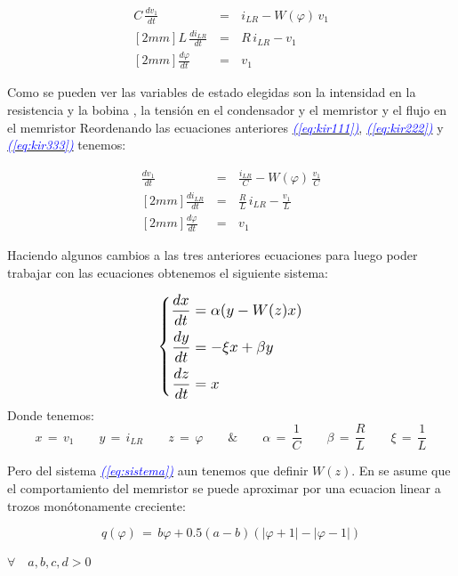 \documentclass[12pt,a4paper]{report} %
\newcommand{\eref}[1]{\hyperref[#1]{\textcolor{blue}{\textit{(\ref*{#1})}}}}
\begin{document}
	
	\begin{eqnarray}
		C\,\frac{dv_1}{dt}\,&=&\,i_{LR}-W(\varphi)\,v_1 \label{eq:kir111} \\ [2mm]
		L\,\frac{di_{LR}}{dt}\,&=&\,R\,i_{LR}-v_1 \label{eq:kir222} \\ [2mm]
		\frac{d\varphi}{dt}\,&=&\,v_1 \label{eq:kir333}
	\end{eqnarray}\smallskip
	
	Como se pueden ver las variables de estado elegidas son la intensidad en la resistencia y la bobina , la tensión en el condensador y el memristor  y el flujo en el memristor \bm{$\varphi$}
	\newpage
	Reordenando las ecuaciones anteriores \eref{eq:kir111}, \eref{eq:kir222} y \eref{eq:kir333} tenemos:
	
	\begin{eqnarray}
		\frac{dv_1}{dt}\,&=&\,\frac{i_{LR}}{C}-W(\varphi)\,\frac{v_1}{C} \label{eq:sis1} \\ [2mm]
		\frac{di_{LR}}{dt}\,&=&\,\frac{R}{L}\,i_{LR}-\frac{v_1}{L} \label{eq:sis2} \\ [2mm]
		\frac{d\varphi}{dt}\,&=&\,v_1 \label{eq:sis3}
	\end{eqnarray}\smallskip
	
	Haciendo algunos cambios a las tres anteriores ecuaciones para luego poder trabajar con las ecuaciones obtenemos el siguiente sistema:
    
	\begin{equation}
		\label{eq:sistema}
		\scalebox{1.2}{$\displaystyle
			\left\{
			\begin{aligned}
				\frac{dx}{dt} &= \alpha (y - W(z)x) \\
				\frac{dy}{dt} &= -\xi x + \beta y \\
				\frac{dz}{dt} &= x
			\end{aligned}
			\right.
			$}
	\end{equation}\smallskip
	Donde tenemos:
	\begin{equation*}
		x\,=\,v_1 \qquad y\,=\,i_{LR} \qquad z\,=\,\varphi \qquad \& \qquad \alpha\,=\,\frac{1}{C} \qquad \beta\,=\,\frac{R}{L} \qquad \xi\,=\,\frac{1}{L}
	\end{equation*}
	
	Pero del sistema \eref{eq:sistema} aun tenemos que definir $W(z)$. En \cite{chuaoscillator2008} se asume que el comportamiento del memristor se puede aproximar por una ecuacion linear a trozos monótonamente creciente:
	
	\begin{equation}
		q(\varphi)\,=\,b\varphi+0.5(a-b)(|\varphi+1|-|\varphi-1|)
		\label{eq:qf}
	\end{equation}
    \begin{center}
    	$\forall\quad a,b,c,d> 0$
    \end{center}
    
\end{document}
